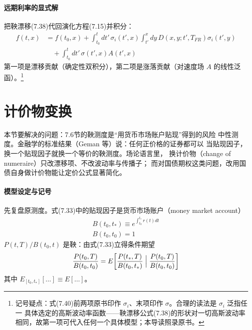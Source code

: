 \paragraph{远期利率的显式解}
把鞅漂移(7.38)代回演化方程(7.15)并积分：
\begin{align*}
f(t,x)&=f(t_0,x)+\int_{t_0}^{t}dt'\,\sigma_i(t',x)
\int_{t'}^{x}dy\,D(x,y;t',T_{FR})\sigma_i(t',y)\\
&\quad+\int_{t_0}^{t}dt'\,\sigma(t',x)A(t',x)
\tag{7.40}
\end{align*}
第一项是漂移贡献（确定性双积分），第二项是涨落贡献（对速度场 $A$
的线性泛函）。\footnote{记号疑点：式(7.40)前两项原书印作
$\sigma_i$、末项印作 $\sigma$。合理的读法是 $\sigma_i$ 泛指任一
具体选定的高斯波动率函数——鞅漂移公式(7.38)的形状对一切高斯波动率
相同，故第一项可代入任何一个具体模型；本导读照录原书。}

\section{计价物变换}

本节要解决的问题：7.6节的鞅测度是“用货币市场账户贴现”得到的风险
中性测度。金融学的标准结果（Geman 等）说：任何正价格的证券都可以
当贴现因子，换一个贴现因子就换一个等价的鞅测度。场论语言里，
换计价物（change of numeraire）只改漂移项、不改波动率与传播子；
而对国债期权这类问题，改用国债自身做计价物能让定价公式显著简化。

\paragraph{模型设定与记号}
先复盘原测度。式(7.33)中的贴现因子是货币市场账户（money market
account）
\begin{gather*}
B(t_0,t_*)\equiv e^{\int_{t_0}^{t_*}r(t)dt}\\
B(t_0,t_0)=1
\tag{7.41}
\end{gather*}
$P(t,T)/B(t_0,t)$ 是鞅：由式(7.33)立得条件期望
\begin{equation*}
\frac{P(t_0,T)}{B(t_0,t_0)}=
E\biggl[\frac{P(t_*,T)}{B(t_0,t_*)}\Bigm|
\frac{P(t_0,T)}{B(t_0,t_0)}\biggr]
\end{equation*}
其中 $E_{[t_0,t_*]}[\ldots]\equiv E[\ldots]$。

